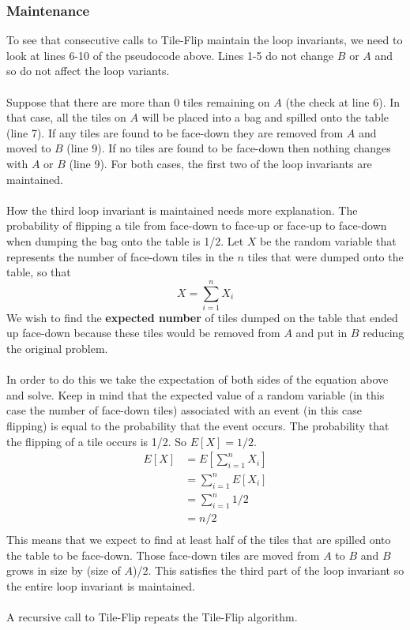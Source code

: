 \documentclass[12pt]{article}
\begin{document}
\subsubsection*{Maintenance}
To see that consecutive calls to Tile-Flip maintain the loop invariants, we need to look at lines 6-10 of the pseudocode above.  Lines 1-5 do not change $B$ or $A$ and so do not affect the loop variants.\\
\\
Suppose that there are more than 0 tiles remaining on $A$ (the check at line 6).  In that case, all the tiles on $A$ will be placed into a bag and spilled onto the table (line 7).  If any tiles are found to be face-down they are removed from $A$ and moved to $B$ (line 9).  If no tiles are found to be face-down then nothing changes with $A$ or $B$ (line 9).  For both cases, the first two of the loop invariants are maintained. \\
\\
How the third loop invariant is maintained needs more explanation.  The probability of flipping a tile from face-down to face-up or face-up to face-down when dumping the bag onto the table is 1/2.  Let $X$ be the random variable that represents the number of face-down tiles in the $n$ tiles that were dumped onto the table, so that 
$$
X = \sum_{i=1}^{n} X_i
$$
We wish to find the \textbf{expected number} of tiles dumped on the table that ended up face-down because these tiles would be removed from $A$ and put in $B$ reducing the original problem.\\
\\
In order to do this we take the expectation of both sides of the equation above and solve.
Keep in mind that the expected value of a random variable (in this case the number of face-down tiles) associated with an event (in this case flipping) is equal to the probability that the event occurs.  The probability that the flipping of a tile occurs is 1/2. So $E[X] = 1/2$.
\begin{align*}
E[X]  &= E[\sum_{i=1}^{n} X_i]\\
	&= \sum_{i=1}^{n} E[X_i]\\
	&= \sum_{i=1}^{n} 1/2\\ 
	&=n/2\\
\end{align*}
\noindent
This means that we expect to find at least half of the tiles that are spilled onto the table to be face-down.  Those face-down tiles are moved from $A$ to $B$ and $B$ grows in size by (size of $A$)/2.  This satisfies the third part of the loop invariant so the entire loop invariant is maintained.\\
\\
A recursive call to Tile-Flip repeats the Tile-Flip algorithm.\\   
\end{document}
